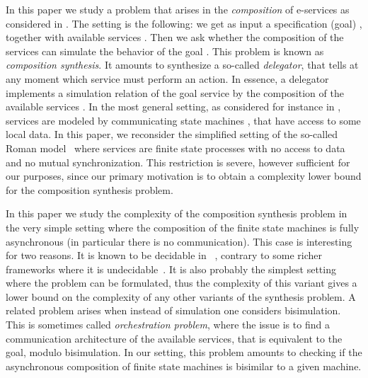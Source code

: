 \documentclass{LMCS}
\theoremstyle{plain}\newtheorem{remark}{Remark}
\theoremstyle{plain}\newtheorem{lemma}[thm]{Lemma}
\begin{document}
In this paper we study a problem that arises in the \emph{composition}
of e-services as considered in \cite{BCGLM03,BCGHM05,vldb05}. The
setting is the following: we get as input a specification (goal)
, together with  available services . Then
we ask whether the composition of the services  can simulate
the behavior of the goal . This problem is known as
\emph{composition synthesis}. It amounts to synthesize a so-called
\emph{delegator}, that tells at any moment which service must perform
an action. In essence, a delegator implements a simulation relation of
the goal service  by the composition of the available services
.  In the most general setting, as considered for instance in
\cite{hbcs03,fbs04,dsv06}, services are modeled by communicating state
machines \cite{bz83}, that have access to some local data. In this
paper, we reconsider the simplified setting of the so-called Roman
model~\cite{BCGLM03} where services are finite state processes with no
access to data and no mutual synchronization. This restriction is
severe, however sufficient for our purposes, since our primary
motivation is to obtain a complexity lower bound for the composition
synthesis problem.


In this paper we study the complexity of the composition synthesis
problem in the very simple setting where the composition of the finite
state machines  is fully asynchronous (in particular there is
no communication). This case is interesting for two reasons. It is
known to be decidable in \EXPTIME~\cite{BCGLM03}, contrary to some
richer frameworks where it is undecidable~\cite{BCGHM05}. It is also
probably the simplest setting where the problem can be formulated,
thus the complexity of this variant gives a lower bound on the
complexity of any other variants of the synthesis problem.  A related
problem arises when instead of simulation one considers bisimulation.
This is sometimes called \emph{orchestration problem}, where the issue
is to find a communication architecture of the available services,
that is equivalent to the goal, modulo bisimulation. In our setting,
this problem amounts to checking if the asynchronous composition of
finite state machines is bisimilar to a given machine.
\end{document}
